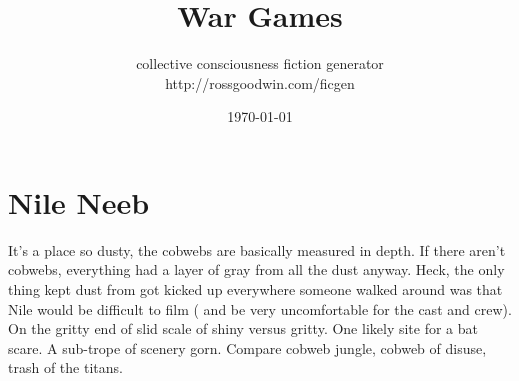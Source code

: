 \documentclass[12pt]{book}
\title{War Games}
\author{collective consciousness fiction generator\\http://rossgoodwin.com/ficgen}
\date{\today}
\begin{document}
\maketitle



\chapter{Nile Neeb}

It's a place so dusty, the cobwebs are basically measured in depth. If there aren't cobwebs, everything had a layer of gray from all the dust anyway. Heck, the only thing kept dust from got kicked up everywhere someone walked around was that Nile would be difficult to film ( and be very uncomfortable for the cast and crew). On the gritty end of slid scale of shiny versus gritty. One likely site for a bat scare. A sub-trope of scenery gorn. Compare cobweb jungle, cobweb of disuse, trash of the titans.
\end{document}
